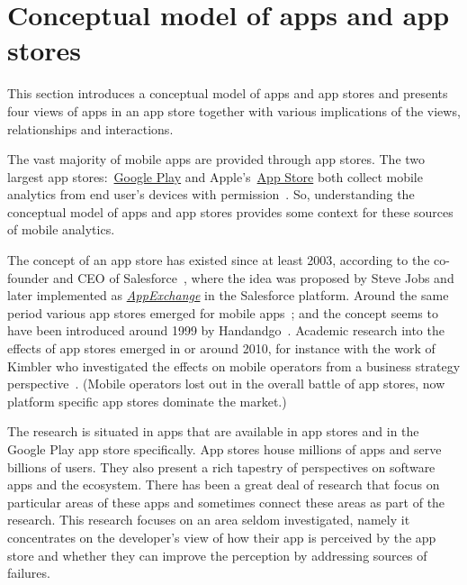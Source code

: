 \section{Conceptual model of apps and app stores}
This section introduces a conceptual model of apps and app stores and presents four views of apps in an app store together with various implications of the views, relationships and interactions. 

The vast majority of mobile apps are provided through app stores. The two largest app stores:~\href{https://play.google.com/store/apps}{Google Play} and Apple's~\href{https://www.apple.com/app-store/}{App Store} both collect mobile analytics from end user's devices with permission~. So, understanding the conceptual model of apps and app stores provides some context for these sources of mobile analytics. 

The concept of an app store has existed since at least 2003, according to the co-founder and CEO of Salesforce~, where the idea was proposed by Steve Jobs and later implemented as \href{https://appexchange.salesforce.com/}{\emph{AppExchange}} in the Salesforce platform. Around the same period various app stores emerged for mobile apps~; and the concept seems to have been introduced around 1999 by Handandgo~. Academic research into the effects of app stores emerged in or around 2010, for instance with the work of Kimbler who investigated the effects on mobile operators from a business strategy perspective~. (Mobile operators lost out in the overall battle of app stores, now platform specific app stores dominate the market.) 

The research is situated in apps that are available in app stores and in the Google Play app store specifically. App stores house millions of apps and serve billions of users. They also present a rich tapestry of perspectives on software apps and the ecosystem. There has been a great deal of research that focus on particular areas of these apps and sometimes connect these areas as part of the research. This research focuses on an area seldom investigated, namely it concentrates on the developer's view of how their app is perceived by the app store and whether they can improve the perception by addressing sources of failures.

